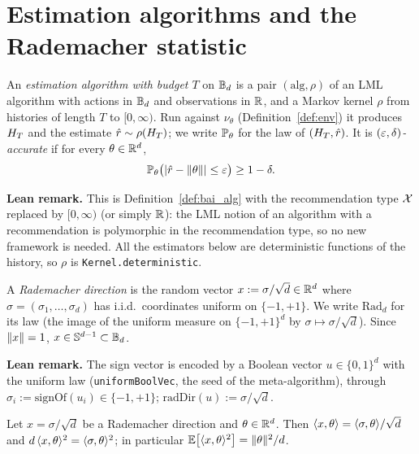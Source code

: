 \section{Estimation algorithms and the Rademacher statistic}
\label{sec:norm_setup}

\begin{definition}\label{def:norm_estimator}
\leanok
{}
An \emph{estimation algorithm with budget $T$} on $\mathbb{B}_d$ is a pair $(\mathrm{alg}, \rho)$
of an LML algorithm with actions in $\mathbb{B}_d$ and observations in $\mathbb{R}$, and a Markov kernel
$\rho$ from histories of length $T$ to $[0,\infty)$. Run against $\nu_\theta$
(Definition~\ref{def:env}) it produces $H_T$ and the estimate $\hat r \sim \rho(H_T)$;
we write $\mathbb{P}_\theta$ for the law of $(H_T, \hat r)$. It is
\emph{$(\varepsilon,\delta)$-accurate} if for every $\theta \in \mathbb{R}^d$,
\[
  \mathbb{P}_\theta\big( \lvert \hat r - \lVert \theta \rVert \rvert \le \varepsilon \big) \ge 1 - \delta .
\]
\end{definition}

\textbf{Lean remark.} This is Definition~\ref{def:bai_alg} with the recommendation type
$\mathcal{X}$ replaced by $[0,\infty)$ (or simply $\mathbb{R}$): the LML notion of an algorithm with a
recommendation is polymorphic in the recommendation type, so no new framework is needed.
All the estimators below are deterministic functions of the history, so $\rho$ is
\texttt{Kernel.deterministic}.

\begin{definition}\label{def:rademacher_direction}
\leanok
{}
A \emph{Rademacher direction} is the random vector $x := \sigma/\sqrt d \in \mathbb{R}^d$ where
$\sigma = (\sigma_1, \dots, \sigma_d)$ has i.i.d.\ coordinates uniform on $\{-1, +1\}$. We
write $\mathrm{Rad}_d$ for its law (the image of the uniform measure on $\{-1,+1\}^d$ by
$\sigma \mapsto \sigma/\sqrt d$). Since $\lVert x \rVert = 1$, $x \in \mathbb{S}^{d-1} \subset \mathbb{B}_d$.
\end{definition}

\textbf{Lean remark.} The sign vector is encoded by a Boolean vector $u \in \{0,1\}^d$ with
the uniform law (\texttt{uniformBoolVec}, the seed of the meta-algorithm), through
$\sigma_i := \mathrm{signOf}(u_i) \in \{-1,+1\}$; $\mathrm{radDir}(u) := \sigma/\sqrt d$.

\begin{lemma}\label{lem:direction_second_moment}
\leanok
{}
Let $x = \sigma/\sqrt d$ be a Rademacher direction and $\theta \in \mathbb{R}^d$. Then
$\langle x, \theta \rangle = \langle \sigma, \theta \rangle/\sqrt d$ and $d\,\langle x, \theta \rangle^2 = \langle \sigma, \theta \rangle^2$;
in particular $\mathbb{E}\big[\langle x, \theta \rangle^2\big] = \lVert \theta \rVert^2/d$.
\end{lemma}

